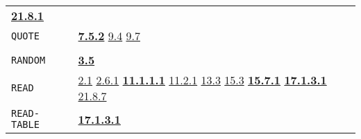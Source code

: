 \documentclass[a4paper]{scrbook}
\begin{document}
\begin{longtable}[]{@{}ll@{}}
\begin{minipage}[t]{0.70\columnwidth}
\textbf{\href{21-interrupts.md\#2181-char-received}{21.8.1}}\strut
\end{minipage}\tabularnewline
\begin{minipage}[t]{0.24\columnwidth}\raggedright\strut
\texttt{QUOTE}\strut
\end{minipage} & \begin{minipage}[t]{0.70\columnwidth}\raggedright\strut
\textbf{\href{07-structured-objects.md\#752-quote-1}{7.5.2}} \href{09-functions.md\#94-quoted-arguments}{9.4}
\href{09-functions.md\#97-eval-and-bind}{9.7}\strut
\end{minipage}\tabularnewline
\begin{minipage}[t]{0.24\columnwidth}\raggedright\strut
\strut
\end{minipage} & \begin{minipage}[t]{0.70\columnwidth}\raggedright\strut
\strut
\end{minipage}\tabularnewline
\begin{minipage}[t]{0.24\columnwidth}\raggedright\strut
\texttt{RANDOM}\strut
\end{minipage} & \begin{minipage}[t]{0.70\columnwidth}\raggedright\strut
\textbf{\href{03-built-in-functions.md\#35-arithmetic-details}{3.5}}\strut
\end{minipage}\tabularnewline
\begin{minipage}[t]{0.24\columnwidth}\raggedright\strut
\texttt{READ}\strut
\end{minipage} & \begin{minipage}[t]{0.70\columnwidth}\raggedright\strut
\href{02-read-evaluate-print.md\#21-general-1}{2.1}
\href{02-read-evaluate-print.md\#261-read-and-fixed-point-numbers}{2.6.1}
\textbf{\href{11-input-output.md\#11111-read}{11.1.1.1}} \href{11-input-output.md\#1121-open}{11.2.1}
\href{13-association-properties.md\#133-examples-of-association}{13.3}
\href{15-lexical-blocking.md\#153-read-and-oblists}{15.3} \textbf{\href{15-lexical-blocking.md\#1571-read-again}{15.7.1}}
\textbf{\href{17-macro-operations.md\#17131-read-finally}{17.1.3.1}} \href{21-interrupts.md\#2187-blocked}{21.8.7}\strut
\end{minipage}\tabularnewline
\begin{minipage}[t]{0.24\columnwidth}\raggedright\strut
\texttt{READ-TABLE}\strut
\end{minipage} & \begin{minipage}[t]{0.70\columnwidth}\raggedright\strut
\textbf{\href{17-macro-operations.md\#17131-read-finally}{17.1.3.1}}\strut

\end{minipage}
\end{longtable}
\end{document}
